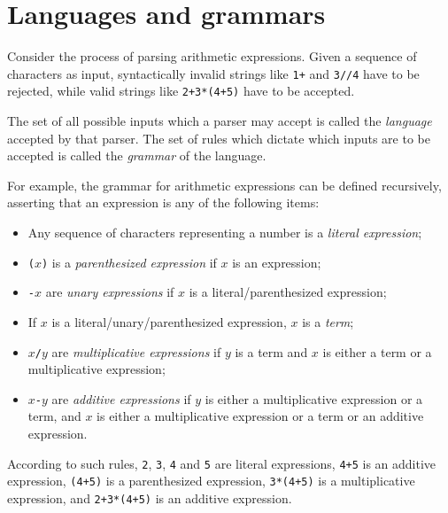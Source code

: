 \documentclass[UdineBachThesis,american,11pt]{PhdThesis}
\begin{document}
  \section{Languages and grammars}

  Consider the process of parsing arithmetic expressions. Given a sequence of
  characters as input, syntactically invalid strings like \mbox{\texttt{1+}} and
  \mbox{\texttt{3//4}} have to be rejected, while valid strings like
  \mbox{\texttt{2+3*(4+5)}} have to be accepted.

  The set of all possible inputs which a parser may accept is called the
  \emph{language} accepted by that parser. The set of rules which dictate which
  inputs are to be accepted is called the \emph{grammar} of the language.

  For example, the grammar for arithmetic expressions can be defined
  recursively, asserting that an expression is any of the following items:

  \begin{itemize}
    \item Any sequence of characters representing a number is a \emph{literal
    expression};

    \item \mbox{\texttt{($x$)}} is a \emph{parenthesized expression} if $x$ is
    an expression;

    \item \mbox{\texttt{-$x$}} are \emph{unary expressions} if $x$ is a
    literal/parenthesized expression;

    \item If $x$ is a literal/unary/parenthesized expression, $x$ is a
    \emph{term};

    \item \mbox{\texttt{$x$/$y$}} are \emph{multiplicative expressions} if $y$
    is a term and $x$ is either a term or a multiplicative expression;

    \item \mbox{\texttt{$x$-$y$}} are \emph{additive expressions} if $y$ is
    either a multiplicative expression or a term, and $x$ is either a
    multiplicative expression or a term or an additive expression.
  \end{itemize}

  According to such rules, \texttt{2}, \texttt{3}, \texttt{4} and \texttt{5} are
  literal expressions, \mbox{\texttt{4+5}} is an additive expression,
  \mbox{\texttt{(4+5)}} is a parenthesized expression, \mbox{\texttt{3*(4+5)}}
  is a multiplicative expression, and \mbox{\texttt{2+3*(4+5)}} is an additive
  expression.
\end{document}
